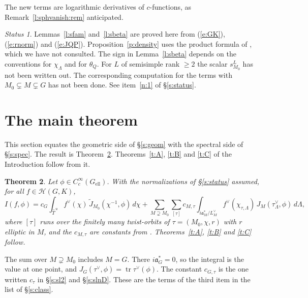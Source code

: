 \documentclass[12pt,letterpaper]{article}
\numberwithin{equation}{section}
\theoremstyle{plain}
\newtheorem{theorem}{Theorem}[section]
\theoremstyle{definition}
\theoremstyle{remark}
\newtheorem{status}[theorem]{Status}
\newcommand{\Hc}{\mathcal{H}}
\newcommand{\fa}{\mathfrak{a}}
\newcommand{\Thu}{\widehat{T}^{\,u}}
\DeclareMathOperator{\tr}{tr}
\newcommand{\ellr}{\mathrm{ell}}
\begin{document}
The new terms are logarithmic derivatives of $c$-functions, as Remark~\ref{l:sphvanish:rem} anticipated.

\begin{status}
Lemmas~\ref{l:sfam} and~\ref{l:sbeta} are proved here from (\ref{e:GK}), (\ref{e:rnorm}) and (\ref{e:JQP}). Proposition~\ref{p:density} uses the product formula of \cite{Ar81}, which we have not consulted. The sign in Lemma~\ref{l:sbeta} depends on the conventions for $\chi_\Lambda$ and for $\theta_Q$. For $L$ of semisimple rank $\ge2$ the scalar $s^L_{M_0}$ has not been written out. The corresponding computation for the terms with $M_0\subsetneq M\subsetneq G$ has not been done. See item~\ref{n:1} of \S\ref{s:status}.
\end{status}

\section{The main theorem}\label{s:main}

This section equates the geometric side of \S\ref{s:geom} with the spectral side of \S\ref{s:spec}. The result is Theorem~\ref{t:main}. Theorems~\ref{t:A}, \ref{t:B} and \ref{t:C} of the Introduction follow from it.

\begin{theorem}\label{t:main}
Let $\phi\in C_c^\infty(G_{\ellr})$. With the normalizations of \S\ref{s:status} assumed, for all $f\in\Hc(G,K)$,
\[
I(f,\phi)=c_G\int_{\Thu}f^\vee(\chi)\,\widetilde J_{M_0}(\chi^{-1},\phi)\,d\chi+\sum_{M\supsetneq M_0}\sum_{[\tau]}c_{M,\tau}\int_{i\fa_M^*/L_M^\vee}f^\vee(\chi_{\tau,\Lambda})\,J_M(\tau_\Lambda^\vee,\phi)\,d\Lambda,
\]
where $[\tau]$ runs over the finitely many twist-orbits of $\tau=(M_0,\chi,r)$ with $r$ elliptic in $M$, and the $c_{M,\tau}$ are constants from \cite{Ar93}. Theorems~\ref{t:A}, \ref{t:B} and \ref{t:C} follow.
\end{theorem}

The sum over $M\supsetneq M_0$ includes $M=G$. There $i\fa_G^*=0$, so the integral is the value at one point, and $J_G(\tau^\vee,\phi)=\tr\tau^\vee(\phi)$. The constant $c_{G,\tau}$ is the one written $c_\tau$ in \S\ref{s:sl2} and \S\ref{s:slnD}. These are the terms of the third item in the list of \S\ref{s:class}.
\end{document}
